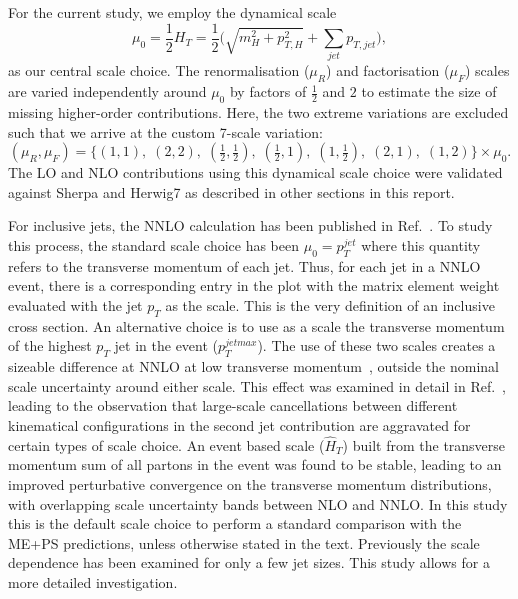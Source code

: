 \documentclass[aps,prd,onecolumn,fleqn,superscriptaddress,groupedaddress,nofootinbib,preprintnumbers,nobalancelastpage]{revtex4}
\begin{document}
For the current study, we employ the dynamical scale
\begin{equation}
  \mu_0 = \frac{1}{2} H_T = \frac{1}{2}\bigg(\sqrt{m_H^2+p_{T,H}^2}+\sum_{jet} p_{T,jet}\bigg) ,\label{eq:SM_Higgs_jet_R:htprimescale}
\end{equation}
as our central scale choice.  The renormalisation ($\mu_R$) and factorisation
($\mu_F$) scales are varied independently around $\mu_0$ by factors of
$\tfrac{1}{2}$ and $2$ to estimate the size of missing higher-order
contributions.  Here, the two extreme variations are excluded such that we
arrive at the custom 7-scale variation:
\begin{equation}
  (\mu_R,\mu_F) = \bigl\{ 
  (1,1), \;
  (2,2), \;
  (\tfrac{1}{2},\tfrac{1}{2}), \;
  (\tfrac{1}{2},1), \;
  (1,\tfrac{1}{2}), \;
  (2,1), \;
  (1,2)
  \bigr\} \times \mu_0 .
\end{equation}
The LO and NLO contributions using this dynamical scale choice were validated
against Sherpa and Herwig7 as described in other sections in this report. 

For inclusive jets, the NNLO calculation has been published in Ref.~\cite{Currie:2016bfm}. To study this process, the standard scale choice has been
$\mu_0=p_T^{jet}$ where this quantity refers to the transverse momentum of each jet. Thus, for each jet in a NNLO event, there is a corresponding entry in the plot
with the matrix element weight evaluated with the jet $p_T$ as the scale. This is the very definition of an inclusive cross section. 
An alternative choice is to use as a scale the transverse momentum of the highest $p_{T}$ jet in the event ($p_{T}^{jetmax}$). The use of these two scales
creates a sizeable difference at NNLO at low transverse momentum~\cite{Currie:2018xkj}, outside the nominal scale uncertainty around either scale. This effect was examined in detail
in Ref.~\cite{Currie:2018xkj}, leading to the observation that large-scale cancellations between different kinematical configurations in the second
jet contribution are aggravated for certain types of scale choice. An event based scale ($\hat{H}_{T}$) built from the transverse momentum sum of all partons in the event was found to be stable, leading to an improved perturbative convergence on the transverse momentum distributions, with overlapping scale uncertainty bands between
NLO and NNLO. In this study this is the default scale choice to perform a standard comparison with the ME+PS predictions, unless otherwise stated in the text. Previously the scale dependence
has been examined for only a few jet sizes. This study allows for a more detailed investigation. 
\end{document}
